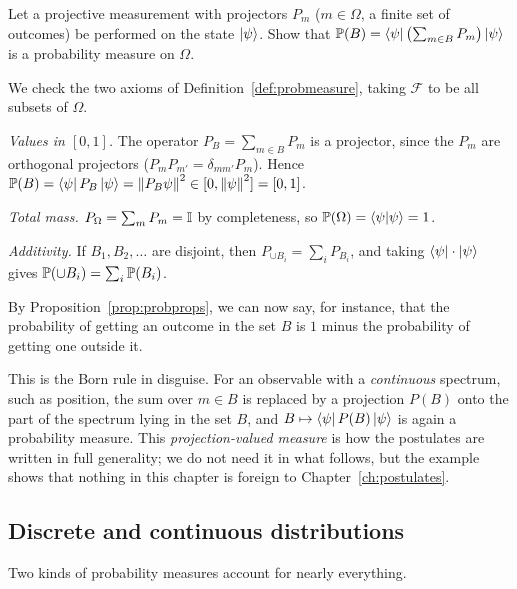 \begin{example}\label{ex:qmeasure}
  Let a projective measurement with projectors $P_m$ ($m\in\Omega$, a finite set of outcomes) be performed on the state $\left|\psi\right\rangle$. Show that $\mathbb{P}(B)=\left\langle\psi\right|\bigl(\sum_{m\in B}P_m\bigr)\left|\psi\right\rangle$ is a probability measure on $\Omega$.
\end{example}
\begin{solution}
  We check the two axioms of Definition~\ref{def:probmeasure}, taking $\mathcal F$ to be all subsets of $\Omega$.
  \begin{steps}
    \item \emph{Values in $[0,1]$.} The operator $P_B=\sum_{m\in B}P_m$ is a projector, since the $P_m$ are orthogonal projectors ($P_mP_{m'}=\delta_{mm'}P_m$). Hence $\mathbb{P}(B)=\left\langle\psi\right| P_B\left|\psi\right\rangle=\left\|P_B\psi\right\|^2\in[0,\left\|\psi\right\|^2]=[0,1]$.
    \item \emph{Total mass.} $P_\Omega=\sum_mP_m=\mathbb{I}$ by completeness, so $\mathbb{P}(\Omega)=\left\langle\psi\middle|\psi\right\rangle=1$.
    \item \emph{Additivity.} If $B_1,B_2,\dots$ are disjoint, then $P_{\cup B_i}=\sum_iP_{B_i}$, and taking $\left\langle\psi\right|\cdot\left|\psi\right\rangle$ gives $\mathbb{P}(\cup B_i)=\sum_i\mathbb{P}(B_i)$.
  \end{steps}
  By Proposition~\ref{prop:probprops}, we can now say, for instance, that the probability of getting an outcome in the set $B$ is $1$ minus the probability of getting one outside it.
\end{solution}

\begin{lookahead}
  This is the Born rule in disguise. For an observable with a \emph{continuous} spectrum, such as position, the sum over $m\in B$ is replaced by a projection $P(B)$ onto the part of the spectrum lying in the set $B$, and $B\mapsto\left\langle\psi\right| P(B)\left|\psi\right\rangle$ is again a probability measure. This
  \emph{projection-valued measure} is how the postulates are written in full generality; we do not need it in what follows, but the example shows that nothing in this chapter is foreign to Chapter~\ref{ch:postulates}.
\end{lookahead}

\subsection{Discrete and continuous distributions}

Two kinds of probability measures account for nearly everything.

